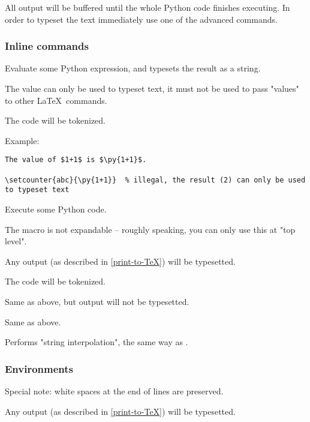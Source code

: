 All output will be buffered until the whole Python code finishes executing.
In order to typeset the text immediately use one of the advanced commands.

\subsubsection{Inline commands}

\DescribeMacro{\py}

Evaluate some Python expression, and typesets the result as a string.

The value can only be used to typeset text, it must not be used to pass "values" to other \LaTeX\ commands.

The code will be tokenized.

Example:
\begin{verbatim}
The value of $1+1$ is $\py{1+1}$.

\setcounter{abc}{\py{1+1}}  % illegal, the result (2) can only be used to typeset text
\end{verbatim}

\DescribeMacro{\pyc}

Execute some Python code.

The macro is not expandable -- roughly speaking, you can only use this at "top level".

Any output (as described in \ref{print-to-TeX}) will be typesetted.

The code will be tokenized.

\DescribeMacro{\pycq}

Same as above, but output will not be typesetted.

\DescribeMacro{\pyfile}
\DescribeMacro{\pyfileq}

Same as above.

\DescribeMacro{\pys}

Performs "string interpolation", the same way as .

\subsubsection{Environments}


Special note: white spaces at the end of lines are preserved.

Any output (as described in \ref{print-to-TeX}) will be typesetted.


